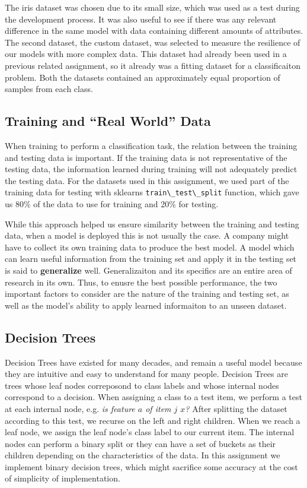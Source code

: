 \documentclass[
  paper=a4,
,captions=tableheading
]{scrartcl}
\newcommand{\passthrough}[1]{#1}
\begin{document}
The iris dataset was chosen due to its small size, which was used as a
test during the development process. It was also useful to see if there
was any relevant difference in the same model with data containing
different amounts of attributes. The second dataset, the custom dataset,
was selected to measure the resilience of our models with more complex
data. This dataset had already been used in a previous related
assignment, so it already was a fitting dataset for a classificaiton
problem. Both the datasets contained an approximately equal proportion
of samples from each class.

\hypertarget{training-and-real-world-data}{%
\subsection{Training and ``Real World''
Data}\label{training-and-real-world-data}}

When training to perform a classification task, the relation between the
training and testing data is important. If the training data is not
representative of the testing data, the information learned during
training will not adequately predict the testing data. For the datasets
used in this assignment, we used part of the training data for testing
with sklearns \passthrough{\lstinline!train\_test\_split!} function,
which gave us 80\% of the data to use for training and 20\% for testing.

While this approach helped us ensure similarity between the training and
testing data, when a model is deployed this is not usually the case. A
company might have to collect its own training data to produce the best
model. A model which can learn useful information from the training set
and apply it in the testing set is said to \textbf{generalize} well.
Generalizaiton and its specifics are an entire area of research in its
own. Thus, to enusre the best possible performance, the two important
factors to consider are the nature of the training and testing set, as
well as the model's ability to apply learned informaiton to an unseen
dataset.

\hypertarget{decision-trees}{%
\subsection{Decision Trees}\label{decision-trees}}

Decision Trees have existed for many decades, and remain a useful model
because they are intuitive and easy to understand for many people.
Decision Trees are trees whose leaf nodes correposond to class labels
and whose internal nodes correspond to a decision. When assigning a
class to a test item, we perform a test at each internal node, e.g.
\textit{is feature $a$ of item $j$ \geq $x$?} After splitting the
dataset according to this test, we recurse on the left and right
children. When we reach a leaf node, we assign the leaf node's class
label to our current item. The internal nodes can perform a binary split
or they can have a set of buckets as their children depending on the
characteristics of the data. In this assignment we implement binary
decision trees, which might sacrifice some accuracy at the cost of
simplicity of implementation.
\end{document}
